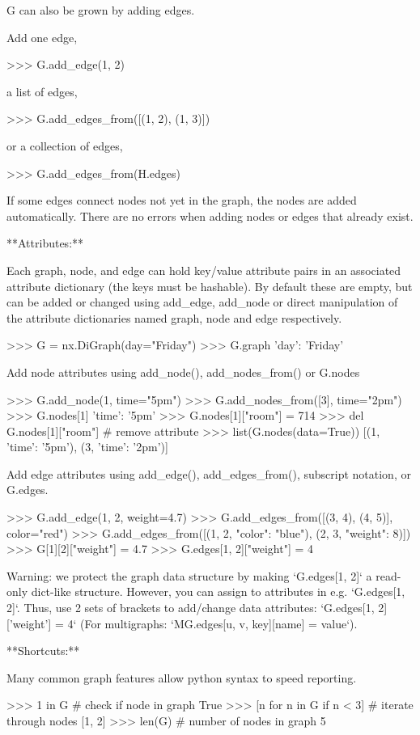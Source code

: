 \begin{DoxyVerb}
G can also be grown by adding edges.

Add one edge,

>>> G.add_edge(1, 2)

a list of edges,

>>> G.add_edges_from([(1, 2), (1, 3)])

or a collection of edges,

>>> G.add_edges_from(H.edges)

If some edges connect nodes not yet in the graph, the nodes
are added automatically.  There are no errors when adding
nodes or edges that already exist.

**Attributes:**

Each graph, node, and edge can hold key/value attribute pairs
in an associated attribute dictionary (the keys must be hashable).
By default these are empty, but can be added or changed using
add_edge, add_node or direct manipulation of the attribute
dictionaries named graph, node and edge respectively.

>>> G = nx.DiGraph(day="Friday")
>>> G.graph
{'day': 'Friday'}

Add node attributes using add_node(), add_nodes_from() or G.nodes

>>> G.add_node(1, time="5pm")
>>> G.add_nodes_from([3], time="2pm")
>>> G.nodes[1]
{'time': '5pm'}
>>> G.nodes[1]["room"] = 714
>>> del G.nodes[1]["room"]  # remove attribute
>>> list(G.nodes(data=True))
[(1, {'time': '5pm'}), (3, {'time': '2pm'})]

Add edge attributes using add_edge(), add_edges_from(), subscript
notation, or G.edges.

>>> G.add_edge(1, 2, weight=4.7)
>>> G.add_edges_from([(3, 4), (4, 5)], color="red")
>>> G.add_edges_from([(1, 2, {"color": "blue"}), (2, 3, {"weight": 8})])
>>> G[1][2]["weight"] = 4.7
>>> G.edges[1, 2]["weight"] = 4

Warning: we protect the graph data structure by making `G.edges[1, 2]` a
read-only dict-like structure. However, you can assign to attributes
in e.g. `G.edges[1, 2]`. Thus, use 2 sets of brackets to add/change
data attributes: `G.edges[1, 2]['weight'] = 4`
(For multigraphs: `MG.edges[u, v, key][name] = value`).

**Shortcuts:**

Many common graph features allow python syntax to speed reporting.

>>> 1 in G  # check if node in graph
True
>>> [n for n in G if n < 3]  # iterate through nodes
[1, 2]
>>> len(G)  # number of nodes in graph
5


\end{DoxyVerb}
